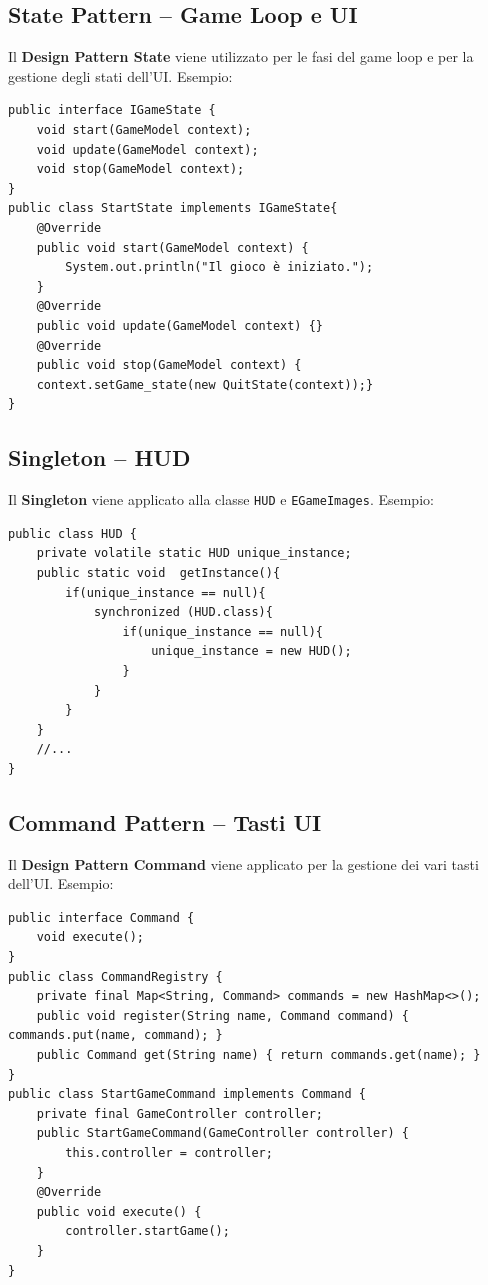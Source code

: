 \documentclass[12pt,a4paper]{article}
\begin{document}
\begin{small}
\subsection{State Pattern – Game Loop e UI}

Il \textbf{Design Pattern State} viene utilizzato per le fasi del game loop e per la gestione
degli stati dell'UI. Esempio:
\begin{verbatim}
public interface IGameState {
    void start(GameModel context);
    void update(GameModel context);
    void stop(GameModel context);
}
public class StartState implements IGameState{
    @Override
    public void start(GameModel context) {
        System.out.println("Il gioco è iniziato.");
    }
    @Override
    public void update(GameModel context) {}
    @Override
    public void stop(GameModel context) {
    context.setGame_state(new QuitState(context));}
}
\end{verbatim}
\subsection{Singleton – HUD}

Il \textbf{Singleton} viene applicato alla classe \texttt{HUD} e \texttt{EGameImages}. Esempio:
\begin{verbatim}
public class HUD {
    private volatile static HUD unique_instance;
    public static void  getInstance(){
        if(unique_instance == null){
            synchronized (HUD.class){
                if(unique_instance == null){
                    unique_instance = new HUD();
                }
            }
        }
    }
    //...
}
\end{verbatim}

\subsection{Command Pattern – Tasti UI}

Il \textbf{Design Pattern Command} viene applicato per la gestione dei vari tasti dell'UI.
Esempio:
\begin{verbatim}
public interface Command {
    void execute();
}
public class CommandRegistry {
    private final Map<String, Command> commands = new HashMap<>();
    public void register(String name, Command command) { commands.put(name, command); }
    public Command get(String name) { return commands.get(name); }
}
public class StartGameCommand implements Command {
    private final GameController controller;
    public StartGameCommand(GameController controller) {
        this.controller = controller;
    }
    @Override
    public void execute() {
        controller.startGame();
    }
}
\end{verbatim}

\end{small}
\end{document}
